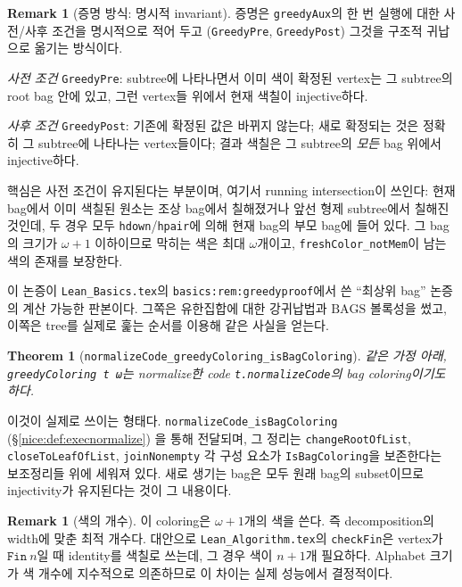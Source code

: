 \documentclass[11pt]{article}
\theoremstyle{definition}
\newtheorem{remark}[definition]{Remark}
\theoremstyle{plain}
\newtheorem{theorem}[definition]{Theorem}
\newcommand{\lean}[1]{\texttt{#1}}
\newcommand{\leanfile}[1]{\texttt{#1}}
\begin{document}
\begin{remark}[증명 방식: 명시적 invariant]
\label{nice:rem:greedyinvariant}
증명은 \lean{greedyAux}의 한 번 실행에 대한 사전/사후 조건을 명시적으로
적어 두고 (\lean{GreedyPre}, \lean{GreedyPost}) 그것을 구조적 귀납으로 옮기는
방식이다.

\emph{사전 조건} \lean{GreedyPre}: subtree에 나타나면서 이미 색이 확정된
vertex는 그 subtree의 root bag 안에 있고, 그런 vertex들 위에서 현재 색칠이
injective하다.

\emph{사후 조건} \lean{GreedyPost}: 기존에 확정된 값은 바뀌지 않는다;
새로 확정되는 것은 정확히 그 subtree에 나타나는 vertex들이다; 결과 색칠은
그 subtree의 \emph{모든} bag 위에서 injective하다.

핵심은 사전 조건이 유지된다는 부분이며, 여기서 running intersection이 쓰인다:
현재 bag에서 이미 색칠된 원소는 조상 bag에서 칠해졌거나 앞선 형제 subtree에서
칠해진 것인데, 두 경우 모두 \lean{hdown}/\lean{hpair}에 의해 현재 bag의
부모 bag에 들어 있다. 그 bag의 크기가 $\omega+1$ 이하이므로 막히는 색은 최대
$\omega$개이고, \lean{freshColor\_notMem}이 남는 색의 존재를 보장한다.

이 논증이 \leanfile{Lean\_Basics.tex}의 \lean{basics:rem:greedyproof}에서
쓴 ``최상위 bag'' 논증의 계산 가능한 판본이다. 그쪽은 유한집합에 대한 강귀납법과
$\mathrm{BAGS}$ 볼록성을 썼고, 이쪽은 tree를 실제로 훑는 순서를 이용해 같은
사실을 얻는다.
\end{remark}

\begin{theorem}[\lean{normalizeCode\_greedyColoring\_isBagColoring}]
\label{nice:thm:greedytransfer}
같은 가정 아래, \lean{greedyColoring t ω}는 \emph{normalize한 code}
\lean{t.normalizeCode}의 bag coloring이기도 하다.
\end{theorem}

이것이 실제로 쓰이는 형태다. \lean{normalizeCode\_isBagColoring}
(\S\ref{nice:def:execnormalize}) 을 통해 전달되며, 그 정리는
\lean{changeRootOfList}, \lean{closeToLeafOfList}, \lean{joinNonempty} 각
구성 요소가 \lean{IsBagColoring}을 보존한다는 보조정리들 위에 세워져 있다.
새로 생기는 bag은 모두 원래 bag의 subset이므로 injectivity가 유지된다는 것이
그 내용이다.

\begin{remark}[색의 개수]
이 coloring은 $\omega+1$개의 색을 쓴다. 즉 decomposition의 width에 맞춘
최적 개수다. 대안으로 \leanfile{Lean\_Algorithm.tex}의 \lean{checkFin}은
vertex가 $\lean{Fin}\ n$일 때 identity를 색칠로 쓰는데, 그 경우 색이 $n+1$개
필요하다. Alphabet 크기가 색 개수에 지수적으로 의존하므로 이 차이는 실제
성능에서 결정적이다.
\end{remark}
\end{document}
